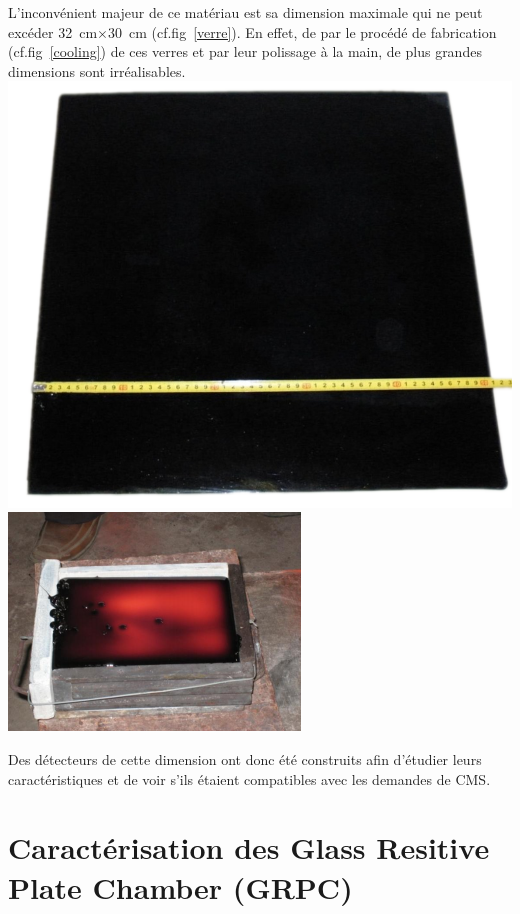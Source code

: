 L'inconvénient majeur de ce matériau est sa dimension maximale qui ne peut excéder \SI{32}{\centi\meter}$\times$\SI{30}{\centi\meter} (cf.fig~\ref{verre}). En effet, de par le procédé de fabrication (cf.fig~\ref{cooling}) de ces verres et par leur polissage à la main, de plus grandes dimensions sont irréalisables.
\marginpar
{
	\centering
	\includegraphics[width=\marginparwidth]{GLA/verre.png}
	\label{verre}
}
\marginpar
{
	\centering
	\includegraphics[width=\marginparwidth]{GLA/cooling.png}
	\label{cooling}
}

Des détecteurs de cette dimension ont donc été construits afin d'étudier leurs caractéristiques et de voir s'ils étaient compatibles avec les demandes de CMS.

\section{Caractérisation des Glass Resitive Plate Chamber (GRPC)}
 
